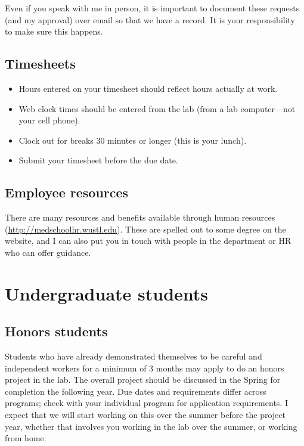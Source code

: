 \documentclass[letterpaper,12pt,oneside]{memoir}
\begin{document}
\begin{shaded}
\noindent Even if you speak with me in person, it is important to document these requests (and my approval) over email so that we have a record. It is your responsibility to make sure this happens.
\end{shaded}

\subsection{Timesheets}

\begin{itemize}
\item Hours entered on your timesheet should reflect hours actually at work.
\item Web clock times should be entered from the lab (from a lab computer---not your cell phone).
\item Clock out for breaks 30 minutes or longer (this is your lunch).
\item Submit your timesheet before the due date.
\end{itemize}


\subsection{Employee resources}

There are many resources and benefits available through human resources (\url{http://medschoolhr.wustl.edu}). These are spelled out to some degree on the website, and I can also put you in touch with people in the department or HR who can offer guidance.


\section{Undergraduate students}

\subsection{Honors students}

Students who have already demonstrated themselves to be careful and independent workers for a minimum of 3 months may apply to do an honors project in the lab. The overall project should be discussed in the Spring for completion the following year. Due dates and requirements differ across programs; check with your individual program for application requirements. I expect that we will start working on this over the summer before the project year, whether that involves you working in the lab over the summer, or working from home.
\end{document}

